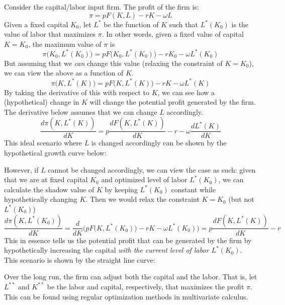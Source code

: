 \documentclass{article}
\begin{document}
      \begin{example}
        Consider the capital/labor input firm. The profit of the firm is: 
        \[\pi = p F(K, L) - r K - \omega L\]
        Given a fixed capital $K_0$, let $L^*$ be the function of $K$ such that $L^*(K_0)$ is the value of labor that maximizes $\pi$. In other words, given a fixed value of capital $K = K_0$, the maximum value of $\pi$ is
        \[\pi\big(K_0, L^*(K_0)\big) = p F\big(K_0, L^*(K_0)\big) - r K_0 - \omega L^*(K_0)\]
        But assuming that we \textit{can} change this value (relaxing the constraint of $K = K_0$), we can view the above as a function of $K$. 
        \[\pi\big(K, L^*(K)\big) = p F\big(K, L^*(K)\big) - r K - \omega L^*(K)\]
        By taking the derivative of this with respect to $K$, we can see how a (hypothetical) change in $K$ will change the potential profit generated by the firm. The derivative below assumes that we can change $L$ accordingly.
        \[\frac{d \pi(K, L^* (K))}{d K} = p \frac{d F (K, L^*(K))}{d K} - r - \omega \frac{d L^*(K)}{dK}\]
        This ideal scenario where $L$ is changed accordingly can be shown by the hypothetical growth curve below: 
        \begin{center}
        \end{center}
        However, if $L$ cannot be changed accordingly, we can view the case as such: given that we are at fixed capital $K_0$ and optimized level of labor $L^*(K_0)$, we can calculate the shadow value of $K$ by keeping $L^*(K_0)$ constant while hypothetically changing $K$. Then we would relax the constraint $K=K_0$ (but not $L^* (K_0)$) 
        \[\frac{d \pi (K, L^* (K_0))}{dK} = \frac{d}{dK} \bigg( p F\big(K, L^*(K_0)\big) - r K - \omega L^*(K_0) \bigg) = p \frac{d F (K, L^*(K))}{d K} - r \]
        This in essence tells us the potential profit that can be generated by the firm by hypothetically increasing the capital \textit{with the current level of labor $L^*(K_0)$}. This scenario is shown by the straight line curve: 
        \begin{center}
        \end{center}
      \end{example}

      Over the long run, the firm can adjust both the capital and the labor. That is, let $L^{**}$ and $K^{**}$ be the labor and capital, respectively, that maximizes the profit $\pi$. This can be found using regular optimization methods in multivariate calculus. 
\end{document}
